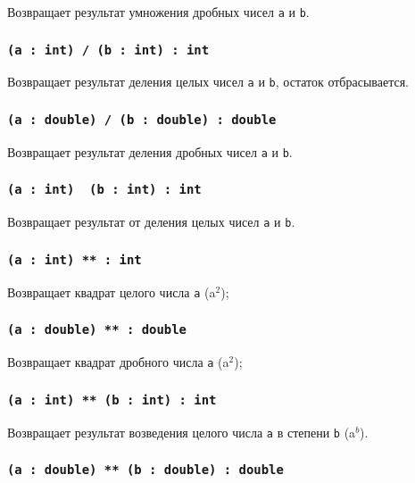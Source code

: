 Возвращает результат умножения дробных чисел \texttt{a} и \texttt{b}.

\subsubsection{\texttt{(a : int) / (b : int) : int}}

Возвращает результат деления целых чисел \texttt{a} и \texttt{b}, остаток отбрасывается.

\subsubsection{\texttt{(a : double) / (b : double) : double}}

Возвращает результат деления дробных чисел \texttt{a} и \texttt{b}.

\subsubsection{\texttt{(a : int) \ (b : int) : int}}

Возвращает результат от деления целых чисел \texttt{a} и \texttt{b}.


\subsubsection{\texttt{(a : int) ** : int}}

Возвращает квадрат целого числа \texttt{a} (a$^2$);

\subsubsection{\texttt{(a : double) ** : double}}

Возвращает квадрат дробного числа \texttt{a} (a$^2$);

\subsubsection{\texttt{(a : int) ** (b : int) : int}}

Возвращает результат возведения целого числа \texttt{a} в степени \texttt{b} (a$^b$).

\subsubsection{\texttt{(a : double) ** (b : double) : double}}

